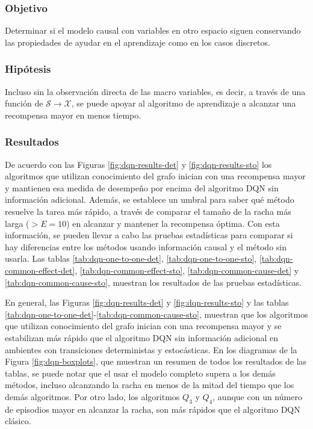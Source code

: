 \subsubsection{Objetivo}

Determinar si el modelo causal con variables  en otro espacio siguen conservando las propiedades
de ayudar en el aprendizaje como en los casos discretos.

\subsubsection{Hipótesis}

Incluso sin la observación directa de las macro variables, es decir, a través de una función de $\mathcal{S} \rightarrow \mathcal{X}$, se puede apoyar 
al algoritmo de aprendizaje a alcanzar una recompensa
mayor en menos tiempo.

\subsubsection{Resultados}

De acuerdo con las Figuras \ref{fig:dqn-results-det} y \ref{fig:dqn-results-sto} los algoritmos que utilizan conocimiento del grafo inician con una recompensa mayor y mantienen esa medida de desempeño por encima del algoritmo DQN
sin información adicional. 
Además, se establece un umbral para saber qué método resuelve la tarea más rápido, a través de comparar el tamaño de la racha más larga ($>E=10$) en alcanzar y mantener la recompensa óptima. Con esta información,
se pueden llevar a cabo las pruebas estadísticas para comparar si hay diferencias 
entre los métodos usando información causal y el método sin usarla. Las tablas \ref{tab:dqn-one-to-one-det}, \ref{tab:dqn-one-to-one-sto}, \ref{tab:dqn-common-effect-det}, \ref{tab:dqn-common-effect-sto},
\ref{tab:dqn-common-cause-det} y \ref{tab:dqn-common-cause-sto}, muestran los resultados de las pruebas estadísticas.

En general, las Figuras \ref{fig:dqn-results-det} y \ref{fig:dqn-results-sto} y las tablas
\ref{tab:dqn-one-to-one-det}-\ref{tab:dqn-common-cause-sto},
muestran que los algoritmos que utilizan conocimiento del grafo inician con una recompensa mayor y se estabilizan más rápido que el algoritmo DQN
sin información adicional en ambientes con transiciones deterministas y estocásticas.
En los diagramas de la Figura \ref{fig:dqn-boxplots}, que muestran un resumen
de todos los resultados de las tablas, se puede notar que el 
usar el modelo completo supera a los demás métodos, incluso alcanzando la racha 
en menos de la mitad del tiempo que los demás algoritmos. Por otro lado, los
algoritmos $Q_3$ y $Q_4$, aunque con un número de episodios mayor en alcanzar 
la racha, son más rápidos que el algoritmo DQN
clásico.


